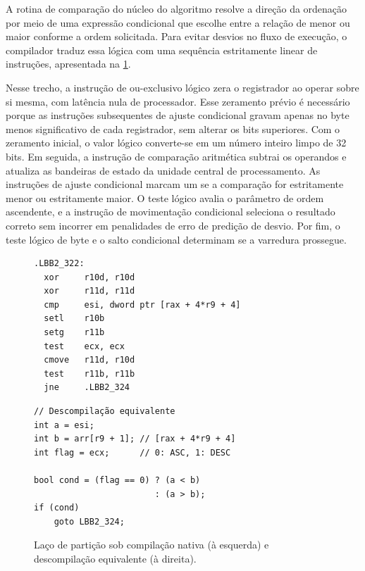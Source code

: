 \documentclass[12pt]{article}
\begin{document}
A rotina de comparação do núcleo do algoritmo resolve a direção da ordenação por meio de uma expressão condicional que escolhe entre a relação de menor ou maior conforme a ordem solicitada. Para evitar desvios no fluxo de execução, o compilador traduz essa lógica com uma sequência estritamente linear de instruções, apresentada na \cref{fig:asm-scalar}.

Nesse trecho, a instrução de ou-exclusivo lógico zera o registrador ao operar sobre si mesma, com latência nula de processador. Esse zeramento prévio é necessário porque as instruções subsequentes de ajuste condicional gravam apenas no byte menos significativo de cada registrador, sem alterar os bits superiores. Com o zeramento inicial, o valor lógico converte-se em um número inteiro limpo de 32 bits. Em seguida, a instrução de comparação aritmética subtrai os operandos e atualiza as bandeiras de estado da unidade central de processamento. As instruções de ajuste condicional marcam um se a comparação for estritamente menor ou estritamente maior. O teste lógico avalia o parâmetro de ordem ascendente, e a instrução de movimentação condicional seleciona o resultado correto sem incorrer em penalidades de erro de predição de desvio. Por fim, o teste lógico de byte e o salto condicional determinam se a varredura prossegue.

\begin{figure}[htbp]
\centering
\begin{minipage}[t]{0.48\textwidth}
\begin{verbatim}
.LBB2_322:
  xor     r10d, r10d
  xor     r11d, r11d
  cmp     esi, dword ptr [rax + 4*r9 + 4]
  setl    r10b
  setg    r11b
  test    ecx, ecx
  cmove   r11d, r10d
  test    r11b, r11b
  jne     .LBB2_324
\end{verbatim}
\end{minipage}\hfill
\begin{minipage}[t]{0.48\textwidth}
\begin{verbatim}
// Descompilação equivalente
int a = esi;
int b = arr[r9 + 1]; // [rax + 4*r9 + 4]
int flag = ecx;      // 0: ASC, 1: DESC

bool cond = (flag == 0) ? (a < b)
                        : (a > b);
if (cond)
    goto LBB2_324;
\end{verbatim}
\end{minipage}
\caption{Laço de partição sob compilação nativa (à esquerda) e descompilação equivalente (à direita).}
\label{fig:asm-scalar}
\end{figure}
\end{document}
